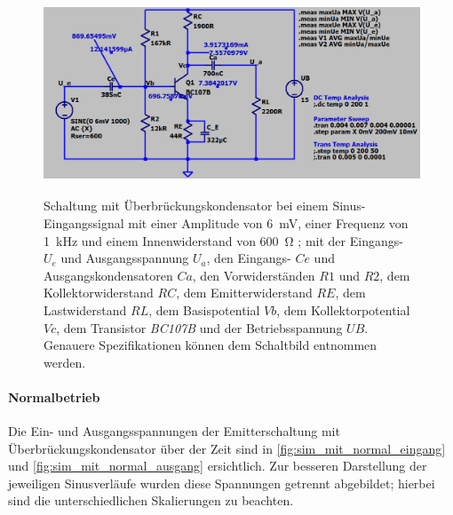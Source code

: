 \documentclass[12pt,english,ngerman]{scrartcl}
\begin{document}
\begin{figure}[H]
    \centering
    \includegraphics[width=\textwidth, height=6cm,keepaspectratio]{./figures/mitkond/messwertemitueberbrueckung.png}
    \caption{Schaltung mit Überbrückungskondensator bei einem Sinus-Eingangssignal
    mit einer Amplitude von \SI{6}{\milli\volt}, einer Frequenz von \SI{1}{\kilo\hertz} und einem
    Innenwiderstand von \SI{600}{\ohm} ; mit der Eingangs- $U_e$ und
    Ausgangsspannung $U_a$, den Eingangs- $Ce$ und Ausgangskondensatoren $Ca$, den
    Vorwiderständen $R1$ und $R2$, dem Kollektorwiderstand $RC$, dem
    Emitterwiderstand $RE$, dem Lastwiderstand $RL$, dem Basispotential $Vb$, dem
    Kollektorpotential $Vc$, dem Transistor \textit{BC107B} und der
    Betriebsspannung $UB$. Genauere Spezifikationen können dem Schaltbild entnommen
    werden.}
    \label{fig:schaltungmitkond}
\end{figure}

\paragraph{Normalbetrieb}

Die Ein- und Ausgangsspannungen der Emitterschaltung mit
Überbrückungskondensator über der Zeit sind in \autoref{fig:sim_mit_normal_eingang} und \autoref{fig:sim_mit_normal_ausgang}
ersichtlich. Zur besseren Darstellung der jeweiligen Sinusverläufe wurden diese Spannungen getrennt abgebildet; hierbei sind die unterschiedlichen Skalierungen zu beachten.
\end{document}

